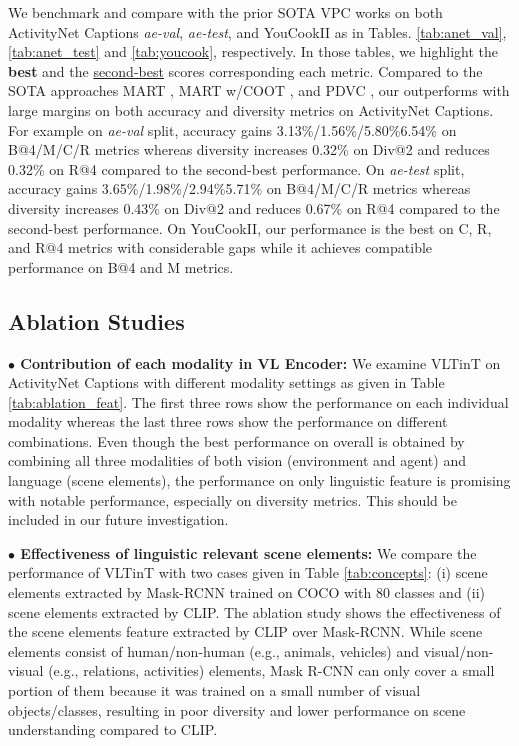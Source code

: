 \documentclass[letterpaper]{article} \usepackage{aaai23}  \usepackage{times}  \usepackage{helvet}  \usepackage{courier}  \usepackage[hyphens]{url}  \usepackage{graphicx} \urlstyle{rm} \def\UrlFont{\rm}  \usepackage{natbib}  \usepackage{caption} \frenchspacing  \setlength{\pdfpagewidth}{8.5in}  \setlength{\pdfpageheight}{11in}  \usepackage{algorithm}
\newcommand{\encoder}{VL Encoder\xspace}
\begin{document}
We benchmark and compare \model with the prior SOTA VPC works on both ActivityNet Captions \textit{ae-val}, \textit{ae-test}, and YouCookII as in Tables. \ref{tab:anet_val}, \ref{tab:anet_test} and  \ref{tab:youcook}, respectively. In those tables, we highlight the \textbf{best} and the \underline{second-best} scores corresponding each metric. Compared to the SOTA approaches MART \cite{lei2020mart}, MART w/COOT \cite{ging2020coot}, and PDVC \cite{wang2021end}, our \model outperforms with large margins on both accuracy and diversity metrics on ActivityNet Captions. For example on \textit{ae-val} split, accuracy gains 3.13\%/1.56\%/5.80\%6.54\% on B@4/M/C/R metrics whereas diversity increases 0.32\% on Div@2 and reduces 0.32\% on R@4 compared to the second-best performance. On \textit{ae-test} split, accuracy gains 3.65\%/1.98\%/2.94\%5.71\% on B@4/M/C/R metrics whereas diversity increases 0.43\% on Div@2 and reduces 0.67\% on R@4 compared to the second-best performance. On YouCookII, our performance is the best on C, R, and R@4 metrics with considerable gaps while it achieves compatible performance on B@4 and M metrics. 

\subsection{Ablation Studies}



\vspace{2mm}
\noindent
\textbf{$\bullet$ Contribution of each modality in \encoder:} We examine VLTinT on ActivityNet Captions with different modality settings as given in Table \ref{tab:ablation_feat}. The first three rows show the performance on each individual modality whereas the last three rows show the performance on different combinations. Even though the best performance on overall is obtained by combining all three modalities of both vision (environment and agent) and language (scene elements), the performance on only linguistic feature is promising with notable performance, especially on diversity metrics. This should be included in our future investigation.














\vspace{2mm}
\noindent
\textbf{$\bullet$ Effectiveness of linguistic relevant scene elements:}
We compare the performance of VLTinT with two cases given in Table \ref{tab:concepts}: (i) scene elements extracted by Mask-RCNN trained on COCO with 80 classes \cite{MaskRCNN_ICCV17} and (ii) scene elements extracted by CLIP. The ablation study shows the effectiveness of the scene elements feature extracted by CLIP over Mask-RCNN. 
While scene elements consist of human/non-human (e.g., animals, vehicles) and visual/non-visual (e.g., relations, activities) elements, Mask R-CNN can only cover a small portion of them because it was trained on a small number of visual objects/classes, resulting in poor diversity and lower performance on scene understanding compared to CLIP. 
\end{document}

